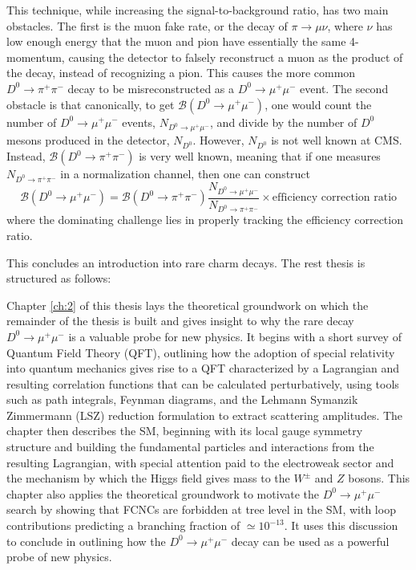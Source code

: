 This technique, while increasing the signal-to-background ratio, has two main obstacles. The first is the muon fake rate, or the decay of $\pi \to \mu \nu$, where $\nu$ has low enough energy that the muon and pion have essentially the same 4-momentum, causing the detector to falsely reconstruct a muon as the product of the decay, instead of recognizing a pion. This causes the more common $D^0 \to \pi^+ \pi^-$ decay to be misreconstructed as a $D^0 \to \mu^+ \mu^-$ event. The second obstacle is that canonically, to get $\mathcal{B}(D^0 \to \mu^+ \mu^-)$, one would count the number of $D^0 \to \mu^+ \mu^-$ events, $N_{D^0 \to \mu^+ \mu^-}$, and divide by the number of $D^0$ mesons produced in the detector, $N_{D^0}$. However, $N_{D^0}$ is not well known at CMS. Instead, $\mathcal{B}(D^0 \to \pi^+ \pi^-)$ is very well known, meaning that if one measures $N_{D^0 \to \pi^+ \pi^-}$ in a normalization channel, then one can construct
$$
\mathcal{B}(D^0 \to \mu^+ \mu^-) = \mathcal{B}(D^0 \to \pi^+ \pi^-) \frac{N_{D^0 \to \mu^+ \mu^-}}{N_{D^0 \to \pi^+ \pi^-}} \times \text{efficiency correction ratio}
$$
where the dominating challenge lies in properly tracking the efficiency correction ratio.

\bigbreak

This concludes an introduction into rare charm decays. The rest thesis is structured as follows:

Chapter \ref{ch:2} of this thesis lays the theoretical groundwork on which the remainder of the thesis is built and gives insight to why the rare decay $D^0 \to \mu^+ \mu^-$ is a valuable probe for new physics. It begins with a short survey of Quantum Field Theory (QFT), outlining how the adoption of special relativity into quantum mechanics gives rise to a QFT characterized by a Lagrangian and resulting correlation functions that can be calculated perturbatively, using tools such as path integrals, Feynman diagrams, and the Lehmann Symanzik Zimmermann (LSZ) reduction formulation to extract scattering amplitudes. The chapter then describes the SM, beginning with its local gauge symmetry structure and building the fundamental particles and interactions from the resulting Lagrangian, with special attention paid to the electroweak sector and the mechanism by which the Higgs field gives mass to the $W^\pm$ and $Z$ bosons. This chapter also applies the theoretical groundwork to motivate the $D^0 \to \mu^+ \mu^-$  search by showing that FCNCs are forbidden at tree level in the SM, with loop contributions predicting a branching fraction of $\simeq 10^{-13}$. It uses this discussion to conclude in outlining how the $D^0 \to \mu^+ \mu^-$ decay can be used as a powerful probe of new physics. 

